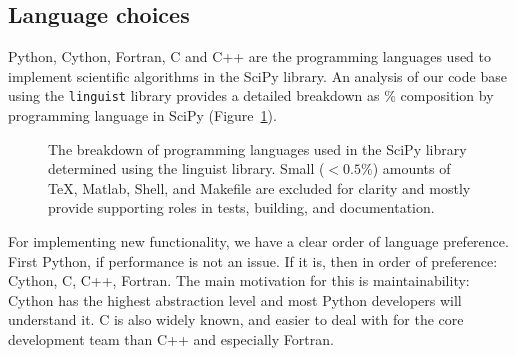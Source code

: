 \documentclass[fleqn,10pt]{wlscirep}
\begin{document}


\subsection*{Language choices}

Python, Cython, Fortran, C and C++ are the programming languages used to
implement scientific algorithms in the SciPy library. An analysis of our code
base using the \texttt{linguist} library\cite{linguistref} provides a 
detailed breakdown as \% composition by programming language in 
SciPy (Figure~\ref{fig:linguist}).

\begin{figure}[H]
    \centering

    \caption{The breakdown of programming languages used in the
             SciPy library determined using the linguist library.
    	 Small ($<0.5 \%$) amounts of TeX, Matlab, Shell,
    	 and Makefile are excluded for clarity and mostly
    	 provide supporting roles in tests, building, and
    	 documentation.}
    \label{fig:linguist}
\end{figure}

For implementing new functionality, we have a clear order of language
preference.  First Python, if performance is not an issue. If it is, then in
order of preference: Cython, C, C++, Fortran. The main motivation for this is
maintainability: Cython has the highest abstraction level and most Python
developers will understand it. C is also widely known, and easier to deal with
for the core development team than C++ and especially Fortran.
\end{document}
